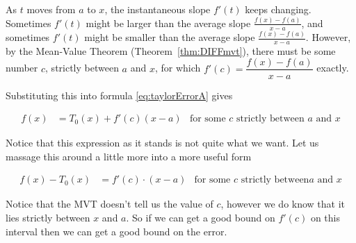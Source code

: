 As $t$ moves from $a$ to $x$, the instantaneous slope $f'(t)$ keeps changing. Sometimes
$f'(t)$ might be larger than the average slope $\tfrac{f(x)-f(a)}{x-a}$, and sometimes
$f'(t)$ might be smaller than the average slope $\tfrac{f(x)-f(a)}{x-a}$. However, by the
Mean-Value Theorem (Theorem~\ref{thm:DIFFmvt}), there must be some number $c$, strictly
between $a$ and $x$, for which  $f'(c)=\dfrac{f(x)-f(a)}{x-a}$ exactly.


Substituting this into formula \eqref{eq:taylorErrorA} gives
\begin{impeqn}\label{eq:taylorErrorL}
\begin{align*}
  f(x) &=T_0(x) +f'(c)(x-a) & \text{for some $c$ strictly between $a$ and $x$}
\end{align*}
\end{impeqn}
Notice that this expression as it stands is not quite what we want. Let us massage this
around a little more into a more useful form
\begin{impeqn}\label{eq:taylorErrorL2}
 \begin{align*}
  f(x) - T_0(x) &= f'(c) \cdot (x-a) & \text{for some $c$ strictly between
$a$ and $x$}
\end{align*}
\end{impeqn}
Notice that the MVT doesn't tell us the value of $c$, however we do know that it lies
strictly between $x$ and $a$. So if we can get a good bound on $f'(c)$ on this interval
then we can get a good bound on the error.

